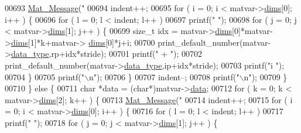 \begin{DoxyCode}
{{{{{{{{{{{{{{{{{{{{{{{{{{{{{{{{{{{{{00693             \hyperlink{group__mat__util_gae7dfa394b111bc908a616f8f5bddaa97}{Mat\_Message}(\textcolor{stringliteral}{"%
00694             indent++;
00695             \textcolor{keywordflow}{for} ( i = 0; i < matvar->\hyperlink{group___m_a_t_a8e01234e1c862ce3472bb37f5a09b92c}{dims}[0]; i++ ) \{
00696                 \textcolor{keywordflow}{for} ( l = 0; l < indent; l++ )
00697                     printf(\textcolor{stringliteral}{"    "});
00698                 \textcolor{keywordflow}{for} ( j = 0; j < matvar->\hyperlink{group___m_a_t_a8e01234e1c862ce3472bb37f5a09b92c}{dims}[1]; j++ ) \{
00699                     \textcolor{keywordtype}{size\_t} idx = matvar->\hyperlink{group___m_a_t_a8e01234e1c862ce3472bb37f5a09b92c}{dims}[0]*matvar->\hyperlink{group___m_a_t_a8e01234e1c862ce3472bb37f5a09b92c}{dims}[1]*k+matvar->
      \hyperlink{group___m_a_t_a8e01234e1c862ce3472bb37f5a09b92c}{dims}[0]*j+i;
00700                     print\_default\_number(matvar->\hyperlink{group___m_a_t_ab6aafe9bd77f0f077852593dec438144}{data\_type},rp+idx*stride);
00701                     printf(\textcolor{stringliteral}{" + "});
00702                     print\_default\_number(matvar->\hyperlink{group___m_a_t_ab6aafe9bd77f0f077852593dec438144}{data\_type},ip+idx*stride);
00703                     printf(\textcolor{stringliteral}{"i "});
00704                 \}
00705                 printf(\textcolor{stringliteral}{"\(\backslash\)n"});
00706             \}
00707             indent--;
00708             printf(\textcolor{stringliteral}{"\(\backslash\)n"});
00709         \}
00710     \} \textcolor{keywordflow}{else} \{
00711         \textcolor{keywordtype}{char} *data = (\textcolor{keywordtype}{char}*)matvar->\hyperlink{group___m_a_t_a5672978efa230bbdecdf38ede781f7fa}{data};
00712         for ( k = 0; k < matvar->\hyperlink{group___m_a_t_a8e01234e1c862ce3472bb37f5a09b92c}{dims}[2]; k++ ) \{
00713             \hyperlink{group__mat__util_gae7dfa394b111bc908a616f8f5bddaa97}{Mat\_Message}(\textcolor{stringliteral}{"%
00714             indent++;
00715             \textcolor{keywordflow}{for} ( i = 0; i < matvar->\hyperlink{group___m_a_t_a8e01234e1c862ce3472bb37f5a09b92c}{dims}[0]; i++ ) \{
00716                 \textcolor{keywordflow}{for} ( l = 0; l < indent; l++ )
00717                     printf(\textcolor{stringliteral}{"    "});
00718                 \textcolor{keywordflow}{for} ( j = 0; j < matvar->\hyperlink{group___m_a_t_a8e01234e1c862ce3472bb37f5a09b92c}{dims}[1]; j++ ) \{
}}}}}}}}}}}}}}}}}}}}}}}}}}}}}}}}}}}}}}}
\end{DoxyCode}
